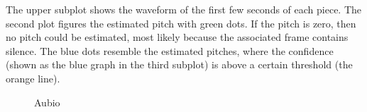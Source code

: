 The upper subplot shows the waveform of the first few seconds of each piece. The second plot figures the estimated pitch with green dots. If the pitch is zero, then no pitch could be estimated, most likely because the associated frame contains silence. The blue dots resemble the estimated pitches, where the confidence (shown as the blue graph in the third subplot) is above a certain threshold (the orange line).
\begin{figure}[htbp]
	\centering
	\caption{Aubio}
	\label{fig:aubio}
\end{figure}
